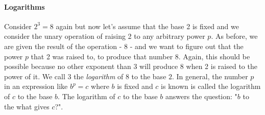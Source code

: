 \paragraph{Logarithms}
Consider $2^3 = 8$ again but now let's assume that the base 2 is fixed and we consider the unary operation of raising 2 to any arbitrary power $p$. As before, we are given the result of the operation - 8 - and we want to figure out that the power $p$ that 2 was raised to, to produce that number 8. Again, this should be possible because no other exponent than 3 will produce 8 when 2 is raised to the power of it. We call $3$ the \emph{logarithm} of $8$ to the base $2$. In general, the number $p$ in an expression like $b^p = c$ where $b$ is fixed and $c$ is known is called the logarithm of $c$ to the base $b$. The logarithm of $c$ to the base $b$ answers the question: "$b$ to the what gives $c$?".






